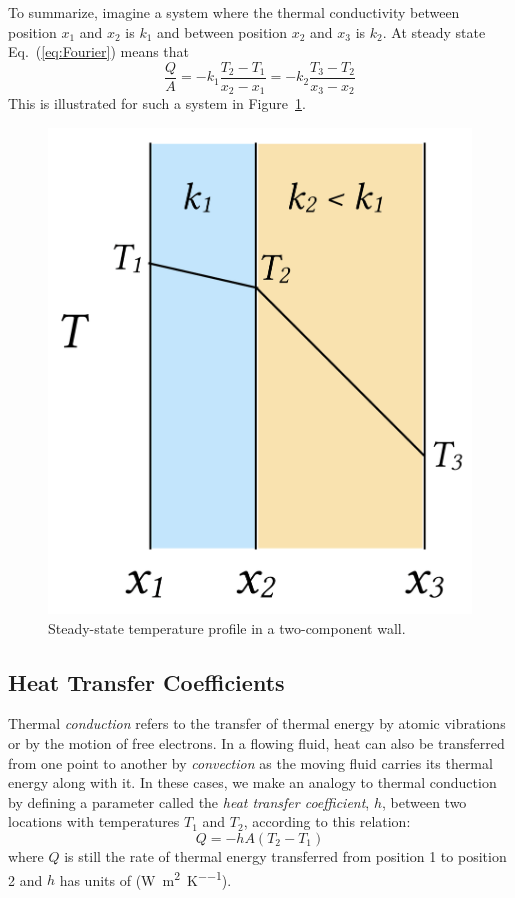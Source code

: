 \documentclass{article}
\begin{document}
To summarize, imagine a system where the thermal conductivity between position $x_1$ and $x_2$ is
$k_1$ and between position $x_2$ and $x_3$ is $k_2$. At steady state Eq.~(\ref{eq:Fourier})
means that
\begin{equation}
    \frac{Q}{A} = -k_1 \frac{T_2 - T_1}{x_2 - x_1} = -k_2 \frac{T_3 - T_2}{x_3 - x_2}
    \label{eq:steadystate01}
\end{equation}
This is illustrated for such a system in Figure~\ref{fig:twowall}.

\begin{figure}
    \centering\includegraphics[scale=0.2]{Figure01.png}
    \caption{\label{fig:twowall} Steady-state temperature profile in a two-component wall.}
\end{figure}

\subsection*{Heat Transfer Coefficients}
Thermal \textit{conduction} refers to the transfer of thermal energy by atomic vibrations or by
the motion of free electrons.  In a flowing fluid, heat can also be transferred
from one point to another by \textit{convection} as the moving
fluid carries its thermal energy along with it.  In these cases, we make an
analogy to thermal conduction by defining a parameter called the
\textit{heat transfer coefficient}, $h$,
between two locations with temperatures $T_1$ and $T_2$, according to this relation:
\begin{equation}
    Q = -h A \left( T_2 - T_1 \right)
    \label{eq:hxfer}
\end{equation}
where $Q$ is still the rate of thermal energy transferred from position 1 to position 2 and $h$
has units of (\si{\watt\per\meter\squared\per\kelvin}).
\end{document}
